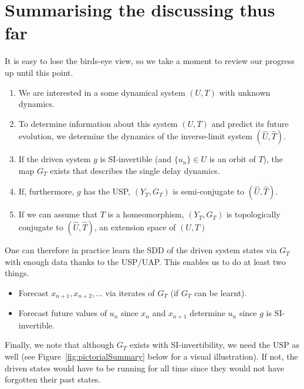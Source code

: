 

\section*{Summarising the discussing thus far}

It is easy to lose the birds-eye view, so we take a moment to review our progress up until this point.

\vspace{-8mm}
\begin{enumerate}
\item We are interested in a some dynamical system $(U,T)$ with unknown dynamics.
\item To determine information about this system $(U,T)$ and predict its future evolution, we determine the dynamics of the inverse-limit system $(\widehat{U}, \widehat{T})$.
\item If the driven system $g$ is SI-invertible (and $\{u_n\}\in{U}$  is an orbit of $T$), the map $G_T$ exists that describes the single delay dynamics. 
\item If, furthermore, $g$ has the USP, $(Y_T, G_T)$ is semi-conjugate to $(\widehat{U}, \widehat{T})$.
\item If we can assume that $T$ is a homeomorphism, $(Y_T, G_T)$ is topologically conjugate to $(\widehat{U}, \widehat{T})$, an extension space of $(U,T)$
\end{enumerate} 

One can therefore in practice learn the SDD of the driven system states via $G_T$ with enough data thanks to the USP/UAP. This enables us to do at least two things. 
\vspace{-8mm}
\begin{itemize}
\item Forecast  $x_{n+1},x_{n+2}, \ldots$ via iterates of $G_T$ (if $G_T$ can be learnt).
\item Forecast future values of $u_n$ since $x_n$ and $x_{n+1}$ determine $u_n$ since $g$ is SI-invertible. 
\end{itemize} 


Finally, we note that although $G_T$ exists with SI-invertibility, we need the USP as well (see Figure~\ref{fig:pictorialSummary} below for a visual illustration). 
If not, the driven states would have to be running for all time since they would not have forgotten their past states. 

